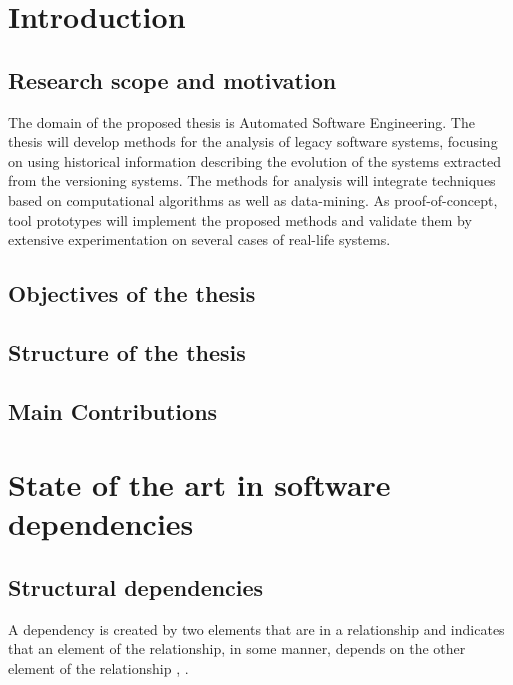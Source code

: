 \documentclass[12pt, a4paper, twoside]{report}
\begin{document}
\vspace*{-4cm}
\pagestyle{empty}
\tableofcontents
\clearpage

\newpage
\vspace*{-4cm}
\listoftables

\newpage
\vspace*{-4cm}
\listoffigures


\pagestyle{fancy}


\newpage
\chapter{Introduction}
\section{Research scope and motivation}


The domain of the proposed thesis is Automated Software Engineering. The thesis will develop methods for the analysis of legacy software systems, focusing on using historical information describing the evolution of the systems extracted from the versioning systems. 
The methods for analysis will integrate techniques based on computational algorithms as well as data-mining. As proof-of-concept, tool prototypes will implement the proposed methods and validate them by extensive experimentation on several cases of real-life systems.\\

\section{Objectives of the thesis}

\section{Structure of the thesis}

\section{Main Contributions}



\chapter{State of the art in software dependencies}
\label{dep}


\section{Structural dependencies}
A dependency is created by two elements that are in a relationship and indicates that an element of the relationship, in some manner, depends on the other element of the relationship \cite{Booch:2004:OAD:975416}, \cite{Cataldo2009SoftwareDW}.
\end{document}
